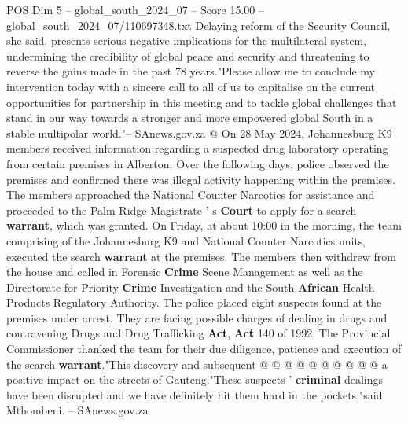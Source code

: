 \begin{textsample}{POS Dim 5 – global\_south\_2024\_07 – Score 15.00 – global\_south\_2024\_07/110697348.txt}
Delaying reform of the Security Council, she said, presents serious negative implications for the multilateral system, undermining the credibility of global peace and security and threatening to reverse the gains made in the past 78 years."Please allow me to conclude my intervention today with a sincere call to all of us to capitalise on the current opportunities for partnership in this meeting and to tackle global challenges that stand in our way towards a stronger and more empowered global South in a stable multipolar world."-- SAnews.gov.za @ On 28 May 2024, Johannesburg K9 members received information regarding a suspected drug laboratory operating from certain premises in Alberton.
Over the following days, police observed the premises and confirmed there was illegal activity happening within the premises.
The members approached the National Counter Narcotics for assistance and proceeded to the Palm Ridge Magistrate ' s \textbf{Court} to apply for a search \textbf{warrant}, which was granted.
On Friday, at about 10:00 in the morning, the team comprising of the Johannesburg K9 and National Counter Narcotics units, executed the search \textbf{warrant} at the premises.
The members then withdrew from the house and called in Forensic \textbf{Crime} Scene Management as well as the Directorate for Priority \textbf{Crime} Investigation and the South \textbf{African} Health Products Regulatory Authority.
The police placed eight suspects found at the premises under arrest.
They are facing possible charges of dealing in drugs and contravening Drugs and Drug Trafficking \textbf{Act}, \textbf{Act} 140 of 1992.
The Provincial Commissioner thanked the team for their due diligence, patience and execution of the search \textbf{warrant}."This discovery and subsequent @ @ @ @ @ @ @ @ @ @ a positive impact on the streets of Gauteng."These suspects ' \textbf{criminal} dealings have been disrupted and we have definitely hit them hard in the pockets,"said Mthombeni. -- SAnews.gov.za

\end{textsample}
